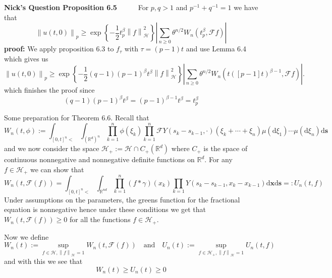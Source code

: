 \documentclass[a4paper,11pt]{article}
\numberwithin{equation}{section}
\theoremstyle{plain}
\theoremstyle{definition}
\newcommand{\ud}{\ensuremath{\mathrm{d} }}
\newcommand{\Norm}[1]{\left\|  #1   \right\|}
\newcommand{\R}{\mathbb{R}}
\newcounter{NQ}
\newenvironment{NickQuestion}[1][] %
{\refstepcounter{NQ}
	\begin{mdframed}[backgroundcolor=lightgray]\textbf{Nick's Question \theNQ \: #1~~}~~~\noindent}%
	{\end{mdframed}}
\numberwithin{NQ}{section}
\numberwithin{LQ}{section}
\numberwithin{ZQ}{section}
\begin{document}
	\begin{NickQuestion}[Proposition 6.5]
		For $p,q > 1$ and $p^{-1}+q^{-1}=1$ we have that
		\[
		\Norm{u(t,0)}_p \ge \exp\left\{ -\frac{1}{2} t_p^\beta \Norm{f}_{\mathcal{H}}^2 \right\}\left| \sum_{n \ge 0} \theta^{n/2} W_n(t_p^\beta, \mathcal{F}f) \right|
		\]
		\textbf{proof:} We apply proposition 6.3 to $f_\tau$ with $\tau = (p-1)t$ and use Lemma 6.4 which  gives us
		\[
		\Norm{u(t,0)}_p \ge  \exp\left\{ -\frac{1}{2}(q-1)(p-1)^\beta t^\beta \Norm{f}_{\mathcal{H}}^2 \right\}\left| \sum_{n \ge 0} \theta^{n/2} W_n(t([p-1]t)^{\beta -1}, \mathcal{F}f) \right|.
		\]
		which finishes the proof since
		\[
		(q-1)(p-1)^\beta t^\beta = (p-1)^{\beta -1} t^\beta = t_p^\beta
		\]
	\end{NickQuestion}

	Some preparation for Theorem 6.6. Recall that
	\[
	W_n(t,\phi) := \int_{[0,t]^n <} \int_{(\R^d)^n} \prod_{k=1}^{n} \phi(\xi_k) \prod_{k=1}^n \mathcal{F}Y(s_k - s_{k-1},\cdot)(\xi_k + \cdots + \xi_n) \mu(\ud \xi_1)\cdots \mu(\ud\xi_n )\ud \textbf{s}
	\]
	and we now consider the space $\mathcal{H}_+ := \mathcal{H} \cap C_+(\R^d)$ where $C_+$ is the space of continuous nonnegative and nonnegative definite functions on $\R^d$. For any $f \in \mathcal{H}_+$ we can show that
	\[
	W_n(t,\mathcal{F}(f)) = \int_{[0,t]^n<} \int_{\R^{nd}} \prod_{k=1}^n(f*\gamma)(x_k) \prod_{k=1} Y(s_k - s_{k-1}, x_k-x_{k-1}) \ud \textbf{x} \ud \textbf{s} =: U_n(t,f)
	\]
	Under assumptions on the parameters, the greens function for the fractional equation is nonnegative hence under these conditions we get that $W_n(t,\mathcal{F}(f)) \ge 0$ for all the functions $f \in \mathcal{H}_+$.

	Now we define
	\[
	W_n(t) := \sup_{f\in\mathcal{H}, \Norm{f}_{\mathcal{H}}=1} W_n(t,\mathcal{F}(f)) \quad \text{and} \quad U_n(t) :=  \sup_{f\in\mathcal{H_+}, \Norm{f}_{\mathcal{H}}=1} U_n(t,f)
	\]
	and with this we see that
	\[
	W_n(t) \ge U_n(t) \ge 0
	\]
\end{document}
